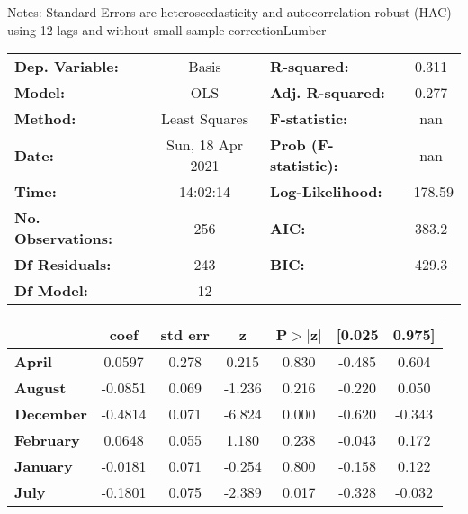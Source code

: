Notes: \newline
 [1] Standard Errors are heteroscedasticity and autocorrelation robust (HAC) using 12 lags and without small sample correctionLumber\begin{center}
\begin{tabular}{lclc}
\toprule
\textbf{Dep. Variable:}    &      Basis       & \textbf{  R-squared:         } &     0.311   \\
\textbf{Model:}            &       OLS        & \textbf{  Adj. R-squared:    } &     0.277   \\
\textbf{Method:}           &  Least Squares   & \textbf{  F-statistic:       } &       nan   \\
\textbf{Date:}             & Sun, 18 Apr 2021 & \textbf{  Prob (F-statistic):} &      nan    \\
\textbf{Time:}             &     14:02:14     & \textbf{  Log-Likelihood:    } &   -178.59   \\
\textbf{No. Observations:} &         256      & \textbf{  AIC:               } &     383.2   \\
\textbf{Df Residuals:}     &         243      & \textbf{  BIC:               } &     429.3   \\
\textbf{Df Model:}         &          12      & \textbf{                     } &             \\
\bottomrule
\end{tabular}
\begin{tabular}{lcccccc}
                   & \textbf{coef} & \textbf{std err} & \textbf{z} & \textbf{P$> |$z$|$} & \textbf{[0.025} & \textbf{0.975]}  \\
\midrule
\textbf{April}     &       0.0597  &        0.278     &     0.215  &         0.830        &       -0.485    &        0.604     \\
\textbf{August}    &      -0.0851  &        0.069     &    -1.236  &         0.216        &       -0.220    &        0.050     \\
\textbf{December}  &      -0.4814  &        0.071     &    -6.824  &         0.000        &       -0.620    &       -0.343     \\
\textbf{February}  &       0.0648  &        0.055     &     1.180  &         0.238        &       -0.043    &        0.172     \\
\textbf{January}   &      -0.0181  &        0.071     &    -0.254  &         0.800        &       -0.158    &        0.122     \\
\textbf{July}      &      -0.1801  &        0.075     &    -2.389  &         0.017        &       -0.328    &       -0.032     \\

\end{tabular}
\end{center}
